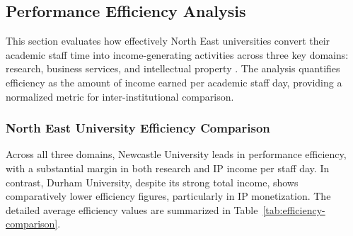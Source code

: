 \documentclass[journal,onecolumn, 10pt,draftclsnofoot]{IEEEtran}
\begin{document}
\subsection{Performance Efficiency Analysis}

This section evaluates how effectively North East universities convert their academic staff time into income-generating activities across three key domains: research, business services, and intellectual property \cite{johnes2006data,worthington2001empirical}. The analysis quantifies efficiency as the amount of income earned per academic staff day, providing a normalized metric for inter-institutional comparison.

\subsubsection{North East University Efficiency Comparison}

Across all three domains, Newcastle University leads in performance efficiency, with a substantial margin in both research and IP income per staff day. In contrast, Durham University, despite its strong total income, shows comparatively lower efficiency figures, particularly in IP monetization. The detailed average efficiency values are summarized in Table~\ref{tab:efficiency-comparison}.
\vspace{0.25cm}
\begin{table}[h]
\centering
\caption{North East University Efficiency Comparison}
\vspace{0.1cm}
\label{tab:efficiency-comparison}
\end{table}
\end{document}

